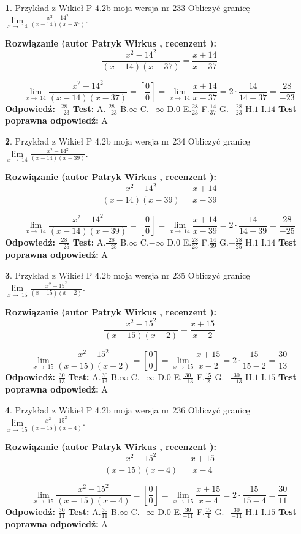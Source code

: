 \documentclass[12pt, a4paper]{article}
\theoremstyle{definition} %
\newtheorem{zad}{}
\newcommand{\zadStart}[1]{\begin{zad}#1\newline}
\newcommand{\zadStop}{\end{zad}}
\newcommand{\rozwStart}[2]{\noindent \textbf{Rozwiązanie (autor #1 , recenzent #2): }\newline}
\newcommand{\rozwStop}{\newline}
\newcommand{\odpStart}{\noindent \textbf{Odpowiedź:}\newline}
\newcommand{\odpStop}{\newline}
\newcommand{\testStart}{\noindent \textbf{Test:}\newline}
\newcommand{\testStop}{\newline}
\newcommand{\kluczStart}{\noindent \textbf{Test poprawna odpowiedź:}\newline}
\newcommand{\kluczStop}{\newline}
\begin{document}
\zadStart{Przykład z Wikieł P 4.2b moja wersja nr 233}
Obliczyć granicę $\lim\limits_{x\to\ 14}\frac{x^{2}-14^{2}}{(x-14)(x-37)}$.
\zadStop
\rozwStart{Patryk Wirkus}{}
$$\frac{x^{2}-14^{2}}{(x-14)(x-37)}=\frac{x+14}{x-37}$$

$$\lim\limits_{x\to\ 14}\frac{x^{2}-14^{2}}{(x-14)(x-37)}=[\frac{0}{0}]=\lim\limits_{x\to\ 14}\frac{x+14}{x-37}=2 \cdot \frac{14}{14-37} = \frac{28}{-23}$$
\rozwStop
\odpStart
$\frac{28}{-23}$
\odpStop
\testStart
A.$\frac{28}{-23}$
B.$\infty$
C.$-\infty$
D.$0$
E.$\frac{28}{23}$
F.$\frac{14}{37}$
G.$-\frac{28}{23}$
H.$1$
I.$14$
\testStop
\kluczStart
A
\kluczStop



\zadStart{Przykład z Wikieł P 4.2b moja wersja nr 234}
Obliczyć granicę $\lim\limits_{x\to\ 14}\frac{x^{2}-14^{2}}{(x-14)(x-39)}$.
\zadStop
\rozwStart{Patryk Wirkus}{}
$$\frac{x^{2}-14^{2}}{(x-14)(x-39)}=\frac{x+14}{x-39}$$

$$\lim\limits_{x\to\ 14}\frac{x^{2}-14^{2}}{(x-14)(x-39)}=[\frac{0}{0}]=\lim\limits_{x\to\ 14}\frac{x+14}{x-39}=2 \cdot \frac{14}{14-39} = \frac{28}{-25}$$
\rozwStop
\odpStart
$\frac{28}{-25}$
\odpStop
\testStart
A.$\frac{28}{-25}$
B.$\infty$
C.$-\infty$
D.$0$
E.$\frac{28}{25}$
F.$\frac{14}{39}$
G.$-\frac{28}{25}$
H.$1$
I.$14$
\testStop
\kluczStart
A
\kluczStop



\zadStart{Przykład z Wikieł P 4.2b moja wersja nr 235}
Obliczyć granicę $\lim\limits_{x\to\ 15}\frac{x^{2}-15^{2}}{(x-15)(x-2)}$.
\zadStop
\rozwStart{Patryk Wirkus}{}
$$\frac{x^{2}-15^{2}}{(x-15)(x-2)}=\frac{x+15}{x-2}$$

$$\lim\limits_{x\to\ 15}\frac{x^{2}-15^{2}}{(x-15)(x-2)}=[\frac{0}{0}]=\lim\limits_{x\to\ 15}\frac{x+15}{x-2}=2 \cdot \frac{15}{15-2} = \frac{30}{13}$$
\rozwStop
\odpStart
$\frac{30}{13}$
\odpStop
\testStart
A.$\frac{30}{13}$
B.$\infty$
C.$-\infty$
D.$0$
E.$\frac{30}{-13}$
F.$\frac{15}{2}$
G.$-\frac{30}{-13}$
H.$1$
I.$15$
\testStop
\kluczStart
A
\kluczStop



\zadStart{Przykład z Wikieł P 4.2b moja wersja nr 236}
Obliczyć granicę $\lim\limits_{x\to\ 15}\frac{x^{2}-15^{2}}{(x-15)(x-4)}$.
\zadStop
\rozwStart{Patryk Wirkus}{}
$$\frac{x^{2}-15^{2}}{(x-15)(x-4)}=\frac{x+15}{x-4}$$

$$\lim\limits_{x\to\ 15}\frac{x^{2}-15^{2}}{(x-15)(x-4)}=[\frac{0}{0}]=\lim\limits_{x\to\ 15}\frac{x+15}{x-4}=2 \cdot \frac{15}{15-4} = \frac{30}{11}$$
\rozwStop
\odpStart
$\frac{30}{11}$
\odpStop
\testStart
A.$\frac{30}{11}$
B.$\infty$
C.$-\infty$
D.$0$
E.$\frac{30}{-11}$
F.$\frac{15}{4}$
G.$-\frac{30}{-11}$
H.$1$
I.$15$
\testStop
\kluczStart
A
\kluczStop
\end{document}

